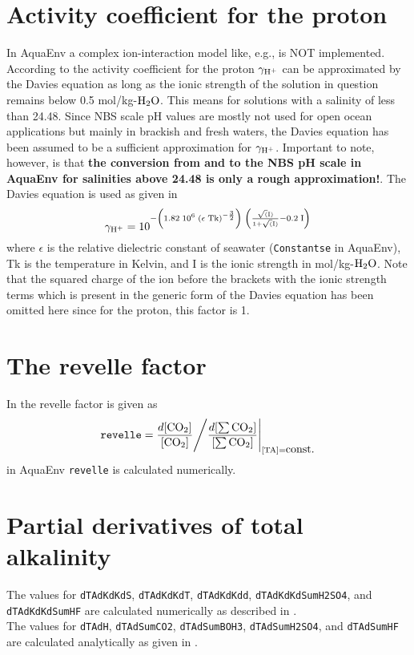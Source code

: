 \documentclass[a4paper]{article}
\begin{document}
\section{Activity coefficient for the proton}
In \textsf{AquaEnv} a complex ion-interaction model like, e.g., \citet{Millero1998} is NOT implemented. 
According to \citet{Zeebe2001} the activity coefficient for the proton $\rm \gamma_{\rm H^+}$  can be approximated by the Davies equation as long as the ionic strength of the solution in question remains below 0.5 mol/kg-$\rm H_2O$. This means for solutions with a salinity of less than 24.48. Since NBS scale pH values are mostly not used for open ocean applications but mainly in brackish and fresh waters, the Davies equation has been assumed to be a sufficient approximation for $\rm \gamma_{\rm H^+}$. Important to note, however, is that \textbf{the conversion from and to the NBS pH scale in \textsf{AquaEnv} for salinities above 24.48 is only a rough approximation!}.
The Davies equation is used as given in \citet{Zeebe2001}
\begin{equation}
\rm \gamma_{\rm H^+}  =  10^{- \left(1.82 \; 10^6 \; \left(\epsilon \; Tk\right)^{-\frac{3}{2}}\right) \; \left( \frac{\sqrt(I)}{1 + \sqrt(I)} - 0.2 \; I\right)}
\end{equation}
where $\epsilon$ is the relative dielectric constant of seawater (\texttt{Constants\textdollar$ $e} in \textsf{AquaEnv}), Tk is the temperature in Kelvin, and I is the ionic strength in mol/kg-$\rm H_2O$. Note that the squared charge of the ion before the brackets with the ionic strength terms which is present in the generic form of the Davies equation has been omitted here since for the proton, this factor is 1.\\

\section{The revelle factor}
In \citet[p.73]{Zeebe2001} the revelle factor is given as
\begin{equation}
\mbox{\texttt{revelle}} = \frac{d [\rm CO_2]}{[\rm CO_2]} \Bigg/ \frac{d \rm [\sum CO_2]}{\rm [\sum CO_2]} \Bigg|_{[\rm TA] = \mbox{const.}}
\end{equation}
in \textsf{AquaEnv} \texttt{revelle} is calculated numerically.

\section{Partial derivatives of total alkalinity}
The values for \texttt{dTAdKdKdS}, \texttt{dTAdKdKdT}, \texttt{dTAdKdKdd}, \texttt{dTAdKdKdSumH2SO4}, and \texttt{dTAdKdKdSumHF} are calculated numerically as described in \citet{Hofmann2009}.\\

\noindent
The values for \texttt{dTAdH},  \texttt{dTAdSumCO2}, \texttt{dTAdSumBOH3}, \texttt{dTAdSumH2SO4}, and  \texttt{dTAdSumHF}  are calculated analytically as given in \citet{Hofmann2008}.




\end{document}
